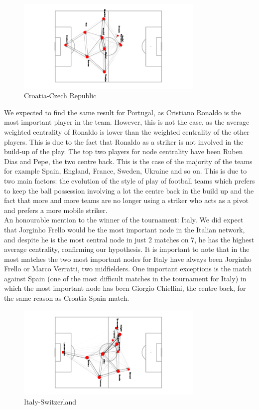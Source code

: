\documentclass[12pt, a4paper]{article}
\begin{document}
\begin{figure}[H]
    \centering
    \includegraphics[width=0.8\textwidth]{../NoSubs/ImagesToRedo/Croatia_Network_Croatia_Czech Republic.png}
    \caption{Croatia-Czech Republic}
    \label{fig: spain_sweden}
\end{figure}


We expected to find the same result for Portugal, as Cristiano Ronaldo is the most important player in the team. However, this is not the case, as the average weighted centrality of Ronaldo is lower than the weighted centrality of the other players. This is due to the fact that Ronaldo as a striker is not involved in the build-up of the play. The top two players for node centrality have been Ruben Dias and Pepe, the two centre back. This is the case of the majority of the teams for example Spain, England, France, Sweden, Ukraine and so on. This is due to two main factors: the evolution of the style of play of football teams which prefers to keep the ball possession involving a lot the centre back in the build up and the fact that more and more teams are no longer using a striker who acts as a pivot and prefers a more mobile striker. \\
An honourable mention to the winner of the tournament: Italy. We did expect that Jorginho Frello would be the most important node in the Italian network, and despite he is the most central node in just 2 matches on 7, he has the highest average centrality, confirming our hypothesis. It is important to note that in the most matches the two most important nodes for Italy have always been Jorginho Frello or Marco Verratti, two midfielders. One important exceptions is the match against Spain (one of the most difficult matches in the tournament for Italy) in which the most important node has been Giorgio Chiellini, the centre back, for the same reason as Croatia-Spain match. \\

\begin{figure}[H]
    \centering
    \includegraphics[width=0.8\textwidth]{../NoSubs/ImagesToRedo/Italy_Network_Italy_Switzerland.png}
    \caption{Italy-Switzerland}
    \label{fig: spain_sweden}
\end{figure}
\end{document}
